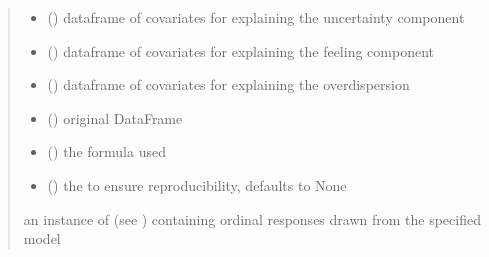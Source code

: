 \documentclass[letterpaper,10pt,english]{sphinxmanual}
\begin{document}
\begin{fulllineitems}
\begin{quote}
\begin{description}
\begin{itemize}
\item {} 
\sphinxAtStartPar
{} () \textendash{} dataframe of covariates for explaining the uncertainty component

\item {} 
\sphinxAtStartPar
{} () \textendash{} dataframe of covariates for explaining the feeling component

\item {} 
\sphinxAtStartPar
{} () \textendash{} dataframe of covariates for explaining the overdispersion

\item {} 
\sphinxAtStartPar
{} () \textendash{} original DataFrame

\item {} 
\sphinxAtStartPar
{} () \textendash{} the formula used

\item {} 
\sphinxAtStartPar
{} (\sphinxstyleliteralemphasis{\sphinxupquote{, }}) \textendash{} the  to ensure reproducibility, defaults to None

\end{itemize}

\sphinxAtStartPar
an instance of  (see ) containing ordinal responses drawn from the specified model

\end{description}\end{quote}

\end{fulllineitems}

\end{document}
